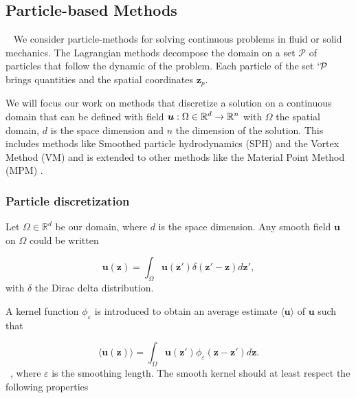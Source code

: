 
\subsection{Particle-based Methods}~\label{Background_Part}
We consider particle-methods for solving continuous problems in fluid or solid mechanics. The Lagrangian methods decompose the domain on a set $\mathcal P$ of particles that follow the dynamic of the problem. Each particle of the set $`\mathcal P$ brings quantities and the spatial coordinates $\bm z_p$.


We will focus our work on methods that discretize a solution on a continuous domain that can be defined with field $\bm u: \Omega \in \mathbb{R}^d \to \mathbb{R}^n$ with $\Omega$ the spatial domain, $d$ is the space dimension and $n$ the dimension of the solution. This includes methods like Smoothed particle hydrodynamics (SPH) \cite{gingold_monaghan_sph_1977,lucy_1977} and the Vortex Method (VM) \cite{cottet_vortex_2000} and is extended to other methods like the Material Point Method (MPM) \cite{sulsky_particle_1994}.

\subsubsection{Particle discretization}

Let $\Omega \in \mathbb R^d$ be our domain, where $d$ is the space dimension. Any smooth field $\bm u$ on $\Omega$ could be written

\begin{equation*}
	\bm u(\bm z) = \int_{\Omega} \bm u(\bm z') \delta(\bm z' - \bm z)  d\bm z',
\end{equation*}with $\delta$ the Dirac delta distribution.

A kernel function $\phi_\varepsilon$ is introduced to obtain an average estimate $\langle \bm u \rangle$ of $\bm u$ such that

\begin{equation*}
	\langle \bm u(\bm z) \rangle = \int_{\Omega} \bm u(\bm z') \phi_\varepsilon(\bm z-\bm z') d\bm z.
\end{equation*}~, where $\varepsilon$ is the smoothing length. The smooth kernel should at least respect the following properties

